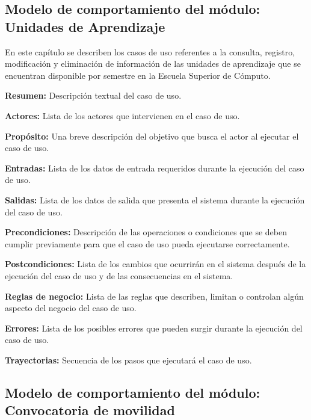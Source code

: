 \subsection{Modelo de comportamiento del módulo: Unidades de Aprendizaje \label{chp:modeloComportamientoUnidadesDeAprendizaje}}

En este capítulo se describen los casos de uso referentes a la consulta, registro, modificación y eliminación de información de las unidades de aprendizaje que se encuentran disponible por semestre en la Escuela Superior de Cómputo. \bigskip

\begin{objetivos}
	\item {\bf Resumen:} Descripción textual del caso de uso.
	\item {\bf Actores:} Lista de los actores que intervienen en el caso de uso.
	\item {\bf Propósito:} Una breve descripción del objetivo que busca el actor al ejecutar el caso de uso.
	\item {\bf Entradas:} Lista de los datos de entrada requeridos durante la ejecución del caso de uso.
	\item {\bf Salidas:} Lista de los datos de salida que presenta el sistema durante la ejecución del caso de uso.
	\item {\bf Precondiciones:} Descripción de las operaciones o condiciones que se deben cumplir previamente para que el caso de uso pueda ejecutarse correctamente.
	\item {\bf Postcondiciones:} Lista de los cambios que ocurrirán en el sistema después de la ejecución del caso de uso y de las consecuencias en el sistema.
	\item {\bf Reglas de negocio:} Lista de las reglas que describen, limitan o controlan algún aspecto del negocio del caso de uso.
	\item {\bf Errores:} Lista de los posibles errores que pueden surgir durante la ejecución del caso de uso.
	\item {\bf Trayectorias:} Secuencia de los pasos que ejecutará el caso de uso.
\end{objetivos}

\newpage
\subsection{Modelo de comportamiento del módulo: Convocatoria de movilidad
	 \label{chp:modeloComportamientoMovilidad}}

